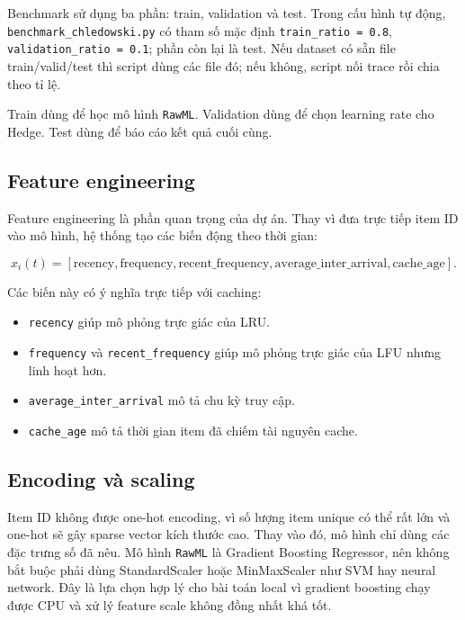 \documentclass[11pt,a4paper]{article}
\newcommand{\code}[1]{\texttt{#1}}
\newcommand{\rawml}{\code{RawML}}
\begin{document}
Benchmark sử dụng ba phần: train, validation và test. Trong cấu hình tự động, \code{benchmark\_chledowski.py} có tham số mặc định \code{train\_ratio = 0.8}, \code{validation\_ratio = 0.1}; phần còn lại là test. Nếu dataset có sẵn file train/valid/test thì script dùng các file đó; nếu không, script nối trace rồi chia theo tỉ lệ.

Train dùng để học mô hình \rawml{}. Validation dùng để chọn learning rate cho Hedge. Test dùng để báo cáo kết quả cuối cùng.

\subsection{Feature engineering}

Feature engineering là phần quan trọng của dự án. Thay vì đưa trực tiếp item ID vào mô hình, hệ thống tạo các biến động theo thời gian:

\[
    x_i(t) =
    \left[
    \text{recency},
    \text{frequency},
    \text{recent\_frequency},
    \text{average\_inter\_arrival},
    \text{cache\_age}
    \right].
\]

Các biến này có ý nghĩa trực tiếp với caching:

\begin{itemize}[leftmargin=1.4em]
    \item \code{recency} giúp mô phỏng trực giác của LRU.
    \item \code{frequency} và \code{recent\_frequency} giúp mô phỏng trực giác của LFU nhưng linh hoạt hơn.
    \item \code{average\_inter\_arrival} mô tả chu kỳ truy cập.
    \item \code{cache\_age} mô tả thời gian item đã chiếm tài nguyên cache.
\end{itemize}

\subsection{Encoding và scaling}

Item ID không được one-hot encoding, vì số lượng item unique có thể rất lớn và one-hot sẽ gây sparse vector kích thước cao. Thay vào đó, mô hình chỉ dùng các đặc trưng số đã nêu. Mô hình \rawml{} là Gradient Boosting Regressor, nên không bắt buộc phải dùng StandardScaler hoặc MinMaxScaler như SVM hay neural network. Đây là lựa chọn hợp lý cho bài toán local vì gradient boosting chạy được CPU và xử lý feature scale không đồng nhất khá tốt.
\end{document}
